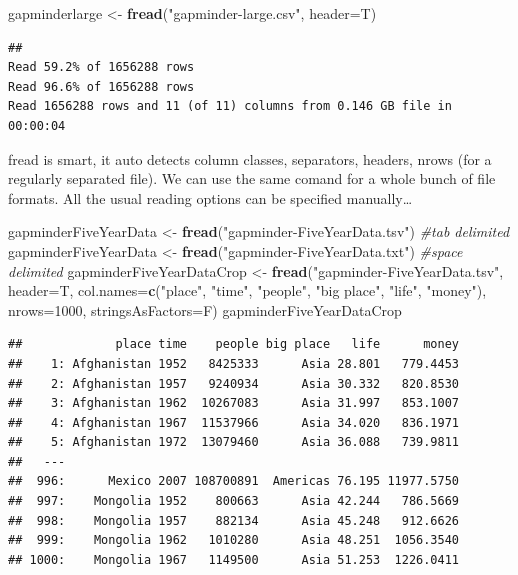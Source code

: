 \documentclass[]{article}
\newenvironment{Shaded}{\begin{snugshade}}{\end{snugshade}}
\newcommand{\KeywordTok}[1]{\textcolor[rgb]{0.13,0.29,0.53}{\textbf{{#1}}}}
\newcommand{\DataTypeTok}[1]{\textcolor[rgb]{0.13,0.29,0.53}{{#1}}}
\newcommand{\DecValTok}[1]{\textcolor[rgb]{0.00,0.00,0.81}{{#1}}}
\newcommand{\StringTok}[1]{\textcolor[rgb]{0.31,0.60,0.02}{{#1}}}
\newcommand{\CommentTok}[1]{\textcolor[rgb]{0.56,0.35,0.01}{\textit{{#1}}}}
\newcommand{\NormalTok}[1]{{#1}}
\begin{document}
\begin{Shaded}
\begin{Highlighting}[]
\NormalTok{gapminderlarge <-}\StringTok{ }\KeywordTok{fread}\NormalTok{(}\StringTok{"gapminder-large.csv"}\NormalTok{, }\DataTypeTok{header=}\NormalTok{T)}
\end{Highlighting}
\end{Shaded}

\begin{verbatim}
## 
Read 59.2% of 1656288 rows
Read 96.6% of 1656288 rows
Read 1656288 rows and 11 (of 11) columns from 0.146 GB file in 00:00:04
\end{verbatim}

fread is smart, it auto detects column classes, separators, headers,
nrows (for a regularly separated file). We can use the same comand for a
whole bunch of file formats. All the usual reading options can be
specified manually\ldots{}

\begin{Shaded}
\begin{Highlighting}[]
\NormalTok{gapminderFiveYearData <-}\StringTok{ }\KeywordTok{fread}\NormalTok{(}\StringTok{"gapminder-FiveYearData.tsv"}\NormalTok{) }\CommentTok{#tab delimited}
\NormalTok{gapminderFiveYearData <-}\StringTok{ }\KeywordTok{fread}\NormalTok{(}\StringTok{"gapminder-FiveYearData.txt"}\NormalTok{) }\CommentTok{#space delimited}
\NormalTok{gapminderFiveYearDataCrop <-}\StringTok{ }\KeywordTok{fread}\NormalTok{(}\StringTok{"gapminder-FiveYearData.tsv"}\NormalTok{, }\DataTypeTok{header=}\NormalTok{T, }\DataTypeTok{col.names=}\KeywordTok{c}\NormalTok{(}\StringTok{"place"}\NormalTok{, }\StringTok{"time"}\NormalTok{, }\StringTok{"people"}\NormalTok{, }\StringTok{"big place"}\NormalTok{, }\StringTok{"life"}\NormalTok{, }\StringTok{"money"}\NormalTok{), }\DataTypeTok{nrows=}\DecValTok{1000}\NormalTok{, }\DataTypeTok{stringsAsFactors=}\NormalTok{F)}
\NormalTok{gapminderFiveYearDataCrop}
\end{Highlighting}
\end{Shaded}

\begin{verbatim}
##             place time    people big place   life      money
##    1: Afghanistan 1952   8425333      Asia 28.801   779.4453
##    2: Afghanistan 1957   9240934      Asia 30.332   820.8530
##    3: Afghanistan 1962  10267083      Asia 31.997   853.1007
##    4: Afghanistan 1967  11537966      Asia 34.020   836.1971
##    5: Afghanistan 1972  13079460      Asia 36.088   739.9811
##   ---                                                       
##  996:      Mexico 2007 108700891  Americas 76.195 11977.5750
##  997:    Mongolia 1952    800663      Asia 42.244   786.5669
##  998:    Mongolia 1957    882134      Asia 45.248   912.6626
##  999:    Mongolia 1962   1010280      Asia 48.251  1056.3540
## 1000:    Mongolia 1967   1149500      Asia 51.253  1226.0411
\end{verbatim}
\end{document}
